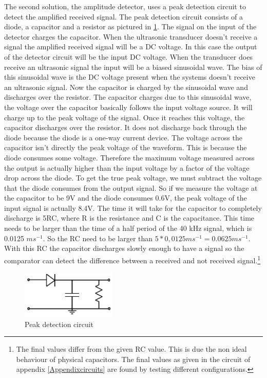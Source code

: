 The second solution, the amplitude detector, uses a peak detection circuit to detect the amplified received signal.
The peak detection circuit consists of a diode, a capacitor and a resistor as pictured in \ref{fig:peak_d}.
The signal on the input of the detector charges the capacitor.
When the ultrasonic transducer doesn't receive a signal the amplified received signal will be a DC voltage.
In this case the output of the detector circuit will be the input DC voltage.
When the transducer does receive an ultrasonic signal the input will be a biased sinusoidal wave.
The bias of this sinusoidal wave is the DC voltage present when the systems doesn't receive an ultrasonic signal.
Now the capacitor is charged by the sinusoidal wave and discharges over the resistor.
The capacitor charges due to this sinusoidal wave, the voltage over the capacitor basically follows the input voltage source. It will charge up to the peak voltage of the signal. Once it reaches this voltage, the capacitor discharges over the resistor.  It does not discharge back through the diode because the diode is a one-way current device. The voltage across the capacitor isn't directly the peak voltage of the waveform. This is because the diode consumes some voltage. Therefore the maximum voltage measured across the output is actually higher than the input voltage by a factor of the voltage drop across the diode. To get the true peak voltage, we must subtract the voltage that the diode consumes from the output signal.
So if we measure the voltage at the capacitor to be 9V and the diode consumes 0.6V, the peak voltage of the input signal is actually 8.4V. The time it will take for the capacitor to completely discharge is 5RC, where R is the resistance and C is the capacitance. This time needs to be larger than the time of a half period of the 40 kHz signal, which is 0.0125 $ms^{-1}$. So the RC need to be larger than $5 * 0,0125 ms^{-1} = 0.0625ms^{-1}$.  With this RC the capacitor discharges slowly enough to have a signal so the comparator can detect the difference between a received and not received signal.\footnote{The final values differ from the given RC value. This is due the non ideal behaviour of physical capacitors. The final values as given in the circuit of appendix \ref{Appendixcircuits} are found by testing different configurations.}

\begin{figure}[H]
\centering
\includegraphics[width=0.4\textwidth]{Figures/peak_d.PNG}
\caption{Peak detection circuit}
\label{fig:peak_d}
\end{figure}

